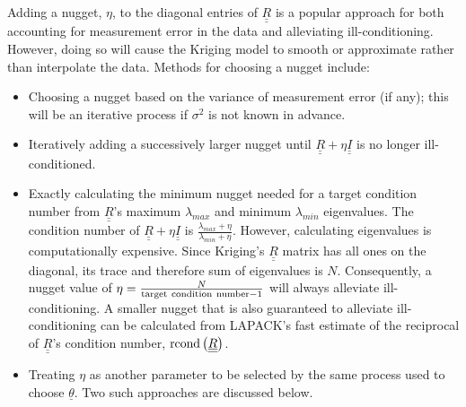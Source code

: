 Adding a nugget, $\eta$, to the diagonal entries of 
$\underline{\underline{R}}$ is a popular approach for both accounting 
for measurement error in the data and alleviating ill-conditioning.
However, doing so will cause the Kriging model to smooth or approximate 
rather than interpolate the data.  Methods for choosing a nugget include:
\begin{itemize}
\item Choosing a nugget based on the variance of measurement error
      (if any); this will be an iterative process if $\sigma^2$ is 
      not known in advance.
\item Iteratively adding a successively larger nugget until 
      $\underline{\underline{R}}+\eta\underline{\underline{I}}$
      is no longer ill-conditioned.
\item Exactly calculating the minimum nugget needed for a target
      condition number from $\underline{\underline{R}}$'s maximum
      $\lambda_{max}$ and minimum $\lambda_{min}$ eigenvalues.
      The condition number of 
      $\underline{\underline{R}}+\eta\underline{\underline{I}}$
      is $\frac{\lambda_{max}+\eta}{\lambda_{min}+\eta}$.  
      However, calculating eigenvalues is computationally expensive.  
      Since Kriging's $\underline{\underline{R}}$ matrix has all ones 
      on the diagonal, its trace and therefore sum of eigenvalues 
      is $N$.  Consequently, a nugget value of
      $\eta=\frac{N}{{\rm target\ condition\ number} - 1}$
      will always alleviate ill-conditioning. A smaller nugget that 
      is also guaranteed to alleviate ill-conditioning can be 
      calculated from LAPACK's fast estimate of the reciprocal of 
      $\underline{\underline{R}}$'s condition number, 
      ${\rm rcond}\left(\underline{\underline{R}}\right)$. 
\item Treating $\eta$ as another parameter to be selected by the
      same process used to choose $\underline{\theta}$.  Two 
      such approaches are discussed below.
\end{itemize}


